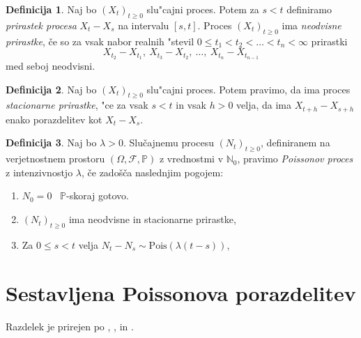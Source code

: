 \documentclass[12pt, a4paper, reqno]{amsart}
\theoremstyle{definition}
\newtheorem{definicija}{Definicija}[section]
\newtheorem{opomba}[definicija]{Opomba}
\theoremstyle{plain}
\newcommand{\N}{\mathbb{N}}
\newcommand{\Prob}{\mathbb{P}}
\newcommand{\1}{\mathds{1}}
\newcommand{\Pois}[1]{\text{Pois}(#1)}
\begin{document}
    \begin{definicija}
        Naj bo $(X_t)_{t\geq0}$ slu"cajni proces. Potem za $s < t$ definiramo
        \textit{prirastek procesa} $X_t - X_s$ na intervalu $[s, t]$. Proces $(X_t)_{t\geq0}$ ima 
        \textit{neodvisne prirastke}, če so za vsak nabor realnih "stevil
        $0 \leq t_1 < t_2 < \ldots < t_n < \infty$ prirastki
        $$
            X_{t_2} - X_{t_1}, \ X_{t_3} - X_{t_2}, \ \ldots, \ X_{t_n} - X_{t_{n-1}}
        $$
        med seboj neodvisni.
        \label{def:prirastek}
    \end{definicija}

    \begin{definicija}
        Naj bo $(X_t)_{t\geq0}$ slu"cajni proces. Potem pravimo, da ima proces
        \textit{stacionarne prirastke}, "ce za vsak $s < t$ in vsak $h > 0$ velja, 
        da ima $X_{t+h} - X_{s+h}$ enako porazdelitev kot $X_t - X_s$.
        \label{def:stacPrir}
    \end{definicija}

    \begin{definicija}
        Naj bo $\lambda > 0$. Slučajnemu procesu $(N_t)_{t\geq 0}$, definiranem na verjetnostnem 
        prostoru $(\Omega, \mathcal{F}, \mathbb{P})$ z vrednostmi v $\N_0$, pravimo 
        \textit{Poissonov proces} z intenzivnostjo $\lambda$, če zadošča naslednjim pogojem:
        \begin{enumerate}
            \item $N_0 = 0$ \ $\Prob$-skoraj gotovo.
            \item $(N_t)_{t\geq 0}$ ima neodvisne in stacionarne prirastke,
            \item Za $0 \leq s < t$ velja $ N_t - N_s \sim\Pois{\lambda(t - s)}$,
        \end{enumerate}
        \label{def:HPP}
    \end{definicija}

\section{Sestavljena Poissonova porazdelitev}

    \noindent
    Razdelek je prirejen po \cite{1}, \cite{2}, \cite{3} in \cite{8}.
\end{document}
